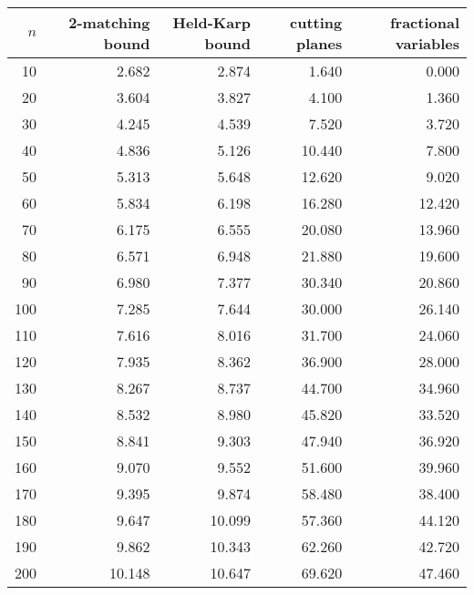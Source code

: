 \documentclass{article}
\begin{document}
\begin{tabular}{|rrrrr|}
\hline
$n$ & 2-matching bound & Held-Karp bound & cutting planes & fractional variables \\
\hline
10 & 2.682 & 2.874 & 1.640 & 0.000 \\
20 & 3.604 & 3.827 & 4.100 & 1.360 \\
30 & 4.245 & 4.539 & 7.520 & 3.720 \\
40 & 4.836 & 5.126 & 10.440 & 7.800 \\
50 & 5.313 & 5.648 & 12.620 & 9.020 \\
60 & 5.834 & 6.198 & 16.280 & 12.420 \\
70 & 6.175 & 6.555 & 20.080 & 13.960 \\
80 & 6.571 & 6.948 & 21.880 & 19.600 \\
90 & 6.980 & 7.377 & 30.340 & 20.860 \\
100 & 7.285 & 7.644 & 30.000 & 26.140 \\
110 & 7.616 & 8.016 & 31.700 & 24.060 \\
120 & 7.935 & 8.362 & 36.900 & 28.000 \\
130 & 8.267 & 8.737 & 44.700 & 34.960 \\
140 & 8.532 & 8.980 & 45.820 & 33.520 \\
150 & 8.841 & 9.303 & 47.940 & 36.920 \\
160 & 9.070 & 9.552 & 51.600 & 39.960 \\
170 & 9.395 & 9.874 & 58.480 & 38.400 \\
180 & 9.647 & 10.099 & 57.360 & 44.120 \\
190 & 9.862 & 10.343 & 62.260 & 42.720 \\
200 & 10.148 & 10.647 & 69.620 & 47.460 \\
\hline
\end{tabular}
\end{document}
